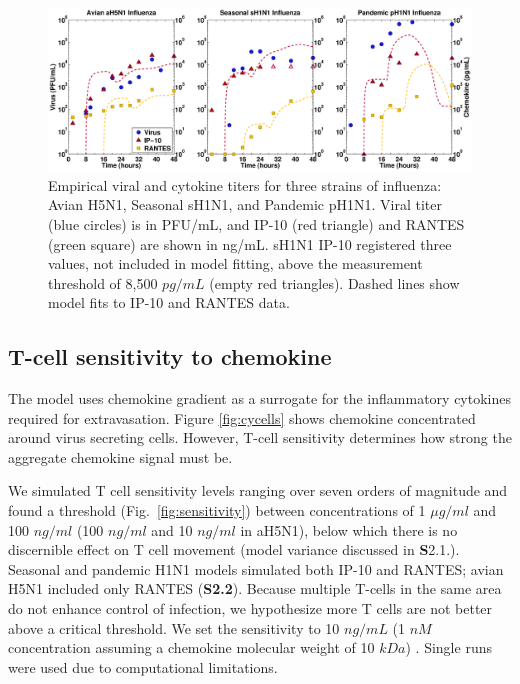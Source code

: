 \documentclass[10pt]{article}
\begin{document}
\begin{figure}[ht!]
\begin{center}
 \includegraphics[width=\textwidth]{data}
 \end{center}
\caption{Empirical viral and cytokine titers for three strains of influenza: Avian H5N1, Seasonal sH1N1, and Pandemic pH1N1.  Viral titer (blue circles) is in PFU/mL, and IP-10 (red triangle) and RANTES (green square) are shown in ng/mL.  sH1N1 IP-10 registered three values, not included in model fitting, above the measurement threshold of 8,500 $pg/mL$ (empty red triangles).  Dashed lines show model fits to IP-10 and RANTES data.} 
 \label{fig:data}
\end{figure}


\subsection*{T-cell sensitivity to chemokine}

The model uses chemokine gradient as a surrogate for the inflammatory cytokines required for extravasation.  Figure \ref{fig:cycells} shows chemokine concentrated around virus secreting cells.  However, T-cell sensitivity determines how strong the aggregate chemokine signal must be.

We simulated T cell sensitivity levels ranging over seven orders of magnitude and found a threshold (Fig.~\ref{fig:sensitivity}) between concentrations of 1 $\mu g/ml$ and 100 $ng/ml$ (100 $ng/ml$ and 10 $ng/ml$ in aH5N1), below which there is no discernible effect on T cell movement (model variance discussed in \textbf{S}2.1.).  Seasonal and pandemic H1N1 models simulated both IP-10 and RANTES; avian H5N1 included only RANTES (\textbf{S2.2}).  Because multiple T-cells in the same area do not enhance control of infection, we hypothesize more T cells are not better above a critical threshold.  We set the sensitivity to 10 $ng/mL$ (1 $nM$ concentration assuming a chemokine molecular weight of 10 $kDa$) \cite{Gao2003}.  Single runs were used due to computational limitations.  
\end{document}
